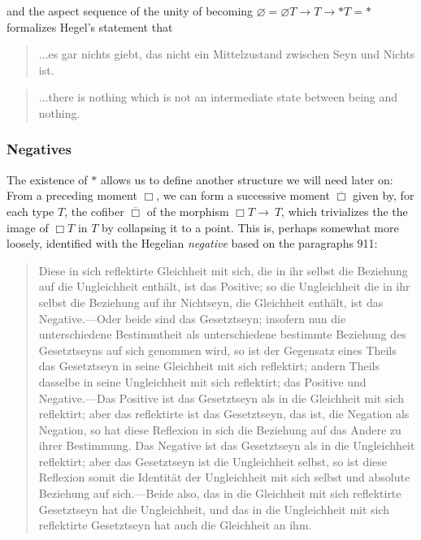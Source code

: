 \documentclass{article}
\begin{document}
and the aspect sequence of the unity of becoming $\varnothing = \varnothing T\rightarrow T \rightarrow * T = 
*$ formalizes Hegel's statement that

\begin{quote}
    ...es gar nichts giebt, das nicht ein Mittelzustand zwischen Seyn und Nichts ist.
\end{quote}

\begin{quote}
    ...there is nothing which is not an intermediate state between being and nothing.
\end{quote}

\subsubsection{Negatives}
The existence of $*$ allows us to define another structure we will need later on: From a preceding moment 
$\Box$, we can form a successive moment $\overline{\Box}$ given by, for each type $T$, the cofiber 
$\overline{\Box}$ of the morphism $\Box T\rightarrow\ T$, which trivializes the the image of $\Box T$ in $T$ 
by collapsing it to a point. This is, perhaps somewhat more loosely, identified with the Hegelian 
\emph{negative} based on the paragraphs 911:

\begin{quote}
    Diese in sich reflektirte Gleichheit mit sich, die in ihr selbst die Beziehung auf die Ungleichheit enthält, ist das Positive; so die Ungleichheit die in ihr selbst die Beziehung auf ihr Nichtseyn, die Gleichheit enthält, ist das Negative.—Oder beide sind das Gesetztseyn; insofern nun die unterschiedene Bestimmtheit als unterschiedene bestimmte Beziehung des Gesetztseyns auf sich genommen wird, so ist der Gegensatz eines Theils das Gesetztseyn in seine Gleichheit mit sich reflektirt; andern Theils dasselbe in seine Ungleichheit mit sich reflektirt; das Positive und Negative.—Das Positive ist das Gesetztseyn als in die Gleichheit mit sich reflektirt; aber das reflektirte ist das Gesetztseyn, das ist, die Negation als Negation, so hat diese Reflexion in sich die Beziehung auf das Andere zu ihrer Bestimmung. Das Negative ist das Gesetztseyn als in die Ungleichheit reflektirt; aber das Gesetztseyn ist die Ungleichheit selbst, so ist diese Reflexion somit die Identität der Ungleichheit mit sich selbst und absolute Beziehung auf sich.—Beide also, das in die Gleichheit mit sich reflektirte Gesetztseyn hat die Ungleichheit, und das in die Ungleichheit mit sich reflektirte Gesetztseyn hat auch die Gleichheit an ihm.
\end{quote}
\end{document}
